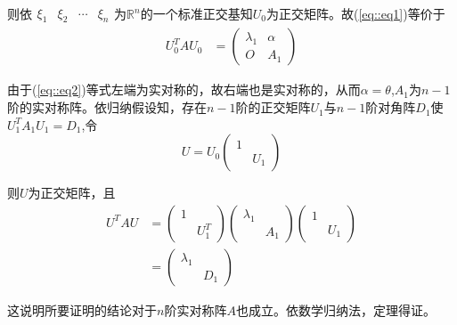 \documentclass{ctexart}
\begin{document}
则依$\begin{matrix} \xi_1 & \xi_2 & \cdots & \xi_n \end{matrix}$为$\mathbb{R}^n$的一个标准正交基知$U_0$为正交矩阵。故(\ref{eq::eq1})等价于
\begin{equation}
    \begin{split}
    U^T_0AU_0
    &=\begin{pmatrix} \lambda_1 & \alpha \\ O &A_1 \end{pmatrix}
    \end{split}
    \label{eq::eq2}
\end{equation}

由于(\ref{eq::eq2})等式左端为实对称的，故右端也是实对称的，从而$\alpha=\theta$,$A_1$为$n-1$阶的实对称阵。依归纳假设知，存在$n-1$阶的正交矩阵$U_1$与$n-1$阶对角阵$D_1$使$U_1^TA_1U_1=D_1$,令
$$
U=U_0\begin{pmatrix} 1 &   \\   &U_1 \end{pmatrix}
$$

则$U$为正交矩阵，且
\begin{equation}
    \begin{split}
    U^TAU
    &=\begin{pmatrix} 1 &   \\   &U_1^T \end{pmatrix}\begin{pmatrix} \lambda_1 &   \\   &A_1 \end{pmatrix}\begin{pmatrix} 1 &   \\   &U_1 \end{pmatrix}\\
    &=\begin{pmatrix} \lambda_1 &   \\   &D_1 \end{pmatrix}
    \end{split}
\end{equation}

这说明所要证明的结论对于$n$阶实对称阵$A$也成立。依数学归纳法，定理得证。
\end{document}

